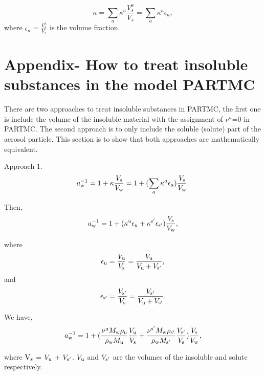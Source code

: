 \documentclass[12pt]{article}
\begin{document}
\begin{equation}\label{eqn:31}
\kappa= \sum_{a} \kappa^{a} \frac {V_{s}^{a}}{V_{s}} = \sum_{a} \kappa^{a} \epsilon_{a},
\end{equation}
where $\epsilon_{a}$ = $ \frac{V_{s}^{a}}{V_{s}}$ is the volume fraction.



\section{Appendix- How to treat insoluble substances in the model PARTMC}

There are two approaches to treat insoluble substances in PARTMC, the first one is include the volume of the insoluble material with the assignment of $\nu^{u}$=$0$ in PARTMC. The second approach is to only include the soluble (solute) part of the aerosol particle. This section is to show that both approaches are mathematically equivalent.
 
Approach 1. 
\begin{equation}\label{eqn:32}
a_{\rm w}^{-1}=1+\kappa \frac{V_{\rm s}}{V_{\rm w}}=1+ (\sum_{a} \kappa^{a} \epsilon_{a})\frac{V_{\rm s}}{V_{\rm w}}.
\end{equation}

Then,
\begin{equation}\label{eqn:33}
a_{\rm w}^{-1}=1+ (\kappa^{\rm u} \epsilon_{\rm u} +\kappa^{\rm s'} \epsilon_{\rm s'}) \frac{V_{\rm s}}{V_{\rm w}},
\end{equation}

where
\begin{equation}\label{eqn:34}
\epsilon_{\rm u}=\frac{V_{\rm u}}{V_{\rm s}}=\frac{V_{\rm u}}{V_{\rm u}+V_{\rm s'}},
\end{equation}
and
\begin{equation}\label{eqn:35}
\epsilon_{\rm s'}=\frac{V_{\rm s'}}{V_{\rm s}}=\frac{V_{\rm s'}}{V_{\rm u}+V_{\rm s'}}.
\end{equation}

We have,
\begin{equation}\label{eqn:36}
a_{\rm w}^{-1}=1+ (  \frac{\nu^{\rm u} M_{\rm w} \rho_{\rm u}}{\rho_{\rm w}M_{\rm u}} 
\frac{V_{\rm u}}{V_{\rm s}} +
\frac{\nu^{\rm s'} M_{\rm w} \rho_{\rm s'}}{\rho_{\rm w} M_{\rm s'}}    
\frac{V_{\rm s'}}{V_{\rm s}})
\frac{V_{\rm s}}{V_{\rm w}},
\end{equation}

where $\rm V_{\rm s}$ = $ V_{\rm u}$ + $V_{\rm s'}$. $V_{\rm u}$ and $V_{\rm s'}$ are the volumes of the insoluble and solute respectively.
\end{document}
